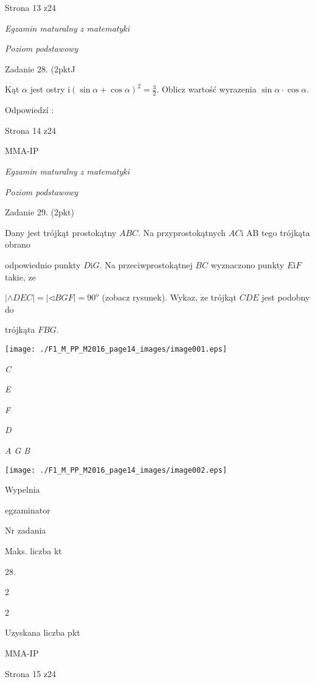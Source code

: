 \documentclass[a4paper,12pt]{article}
\begin{document}
Strona 13 z24





{\it Egzamin maturalny z matematyki}

{\it Poziom podstawowy}

Zadanie 28. (2pktJ

Kąt $\alpha$ jest ostry $\displaystyle \mathrm{i}(\sin\alpha+\cos\alpha)^{2}=\frac{3}{2}$. Oblicz wartość wyrazenia $\sin\alpha\cdot\cos\alpha.$

Odpowiedzí :

Strona 14 z24

MMA-IP





{\it Egzamin maturalny z matematyki}

{\it Poziom podstawowy}

Zadanie 29. (2pkt)

Dany jest trójkąt prostokątny $ABC$. Na przyprostokątnych $AC\mathrm{i}$ AB tego trójkąta obrano

odpowiednio punkty $D\mathrm{i}G$. Na przeciwprostokątnej $BC$ wyznaczono punkty $E\mathrm{i}F$ takie, $\dot{\mathrm{z}}\mathrm{e}$

$|\wedge DEC|=|\triangleleft BGF|=90^{\mathrm{o}}$ (zobacz rysunek). Wykaz, $\dot{\mathrm{z}}\mathrm{e}$ trójkąt $CDE$ jest podobny do

trójkąta $FBG.$
\begin{center}
\texttt{[image: ./F1\_M\_PP\_M2016\_page14\_images/image001.eps]}
\end{center}
{\it C}

{\it E}

{\it F}

{\it D}

{\it A  G B}
\begin{center}
\texttt{[image: ./F1\_M\_PP\_M2016\_page14\_images/image002.eps]}
\end{center}
Wypelnia

egzaminator

Nr zadania

Maks. liczba kt

28.

2

2

Uzyskana liczba pkt

MMA-IP

Strona 15 z24
\end{document}

